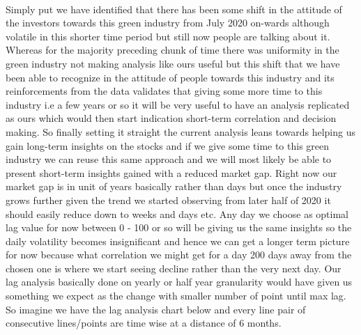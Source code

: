 \documentclass[sigconf, nonacm]{acmart}
\begin{document}
\\Simply put we have identified that there has been some shift in the attitude of the investors towards this green industry from July 2020 on-wards although volatile in this shorter time period but still now people are talking about it. Whereas for the majority preceding chunk of time there was uniformity in the green industry not making analysis like ours useful but this shift that we have been able to recognize in the attitude of people towards this industry and its reinforcements from the data validates that giving some more time to this industry i.e a few years or so it will be very useful to have an analysis replicated as ours which would then start indication short-term correlation and decision making. 
\newline
So finally setting it straight the current analysis leans towards helping us gain long-term insights on the stocks and if we give some time to this green industry we can reuse this same approach and we will most likely be able to present short-term insights gained with a reduced market gap. Right now our market gap is in unit of years basically rather than days but once the industry grows further given the trend we started observing from later half of 2020 it should easily reduce down to weeks and days etc. Any day we choose as optimal lag value for now between 0 - 100 or so will be giving us the same insights so the daily volatility becomes insignificant and hence we can get a longer term picture for now because what correlation we might get for a day 200 days away from the chosen one is where we start seeing decline rather than the very next day. Our lag analysis basically done on yearly or half year granularity would have given us something we expect as the change with smaller number of point until max lag. So imagine we have the lag analysis chart below and every line pair of consecutive lines/points are time wise at a distance of 6 months.
\newline
\end{document}
